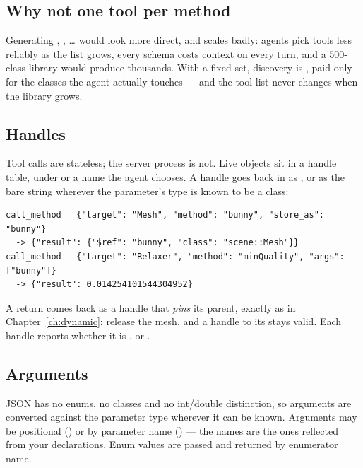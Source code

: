 \subsection*{Why not one tool per method}

Generating , , \ldots{} would look more
direct, and scales badly: agents pick tools less reliably as the list grows,
every schema costs context on every turn, and a 500-class library would produce
thousands. With a fixed set, discovery is , paid only for
the classes the agent actually touches --- and the tool list never changes when
the library grows.

\subsection*{Handles}

Tool calls are stateless; the server process is not. Live objects sit in a
handle table, under  or a name the agent chooses. A handle
goes back in as , or as the bare string
 wherever the parameter's type is known to be a class:

\begin{lstlisting}[style=json]
call_method   {"target": "Mesh", "method": "bunny", "store_as": "bunny"}
  -> {"result": {"$ref": "bunny", "class": "scene::Mesh"}}
call_method   {"target": "Relaxer", "method": "minQuality", "args": ["bunny"]}
  -> {"result": 0.014254101544304952}
\end{lstlisting}

A  return comes back as a handle that \emph{pins} its parent, exactly
as in Chapter~\ref{ch:dynamic}: release the mesh, and a handle to its
 stays valid. Each handle reports whether it is ,
 or .

\subsection*{Arguments}

JSON has no enums, no classes and no int/double distinction, so arguments are
converted against the parameter type wherever it can be known. Arguments may
be positional () or by parameter name
() --- the names are the ones reflected from your
declarations. Enum values are passed and returned by enumerator name.

